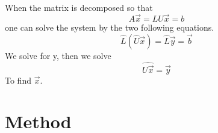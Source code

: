 \documentclass[%
reprint,
amsmath,amssymb,
aps,
]{revtex4-1}
\begin{document}
\noindent When the matrix is decomposed so that 
\begin{equation}
A\vec{x} = LU\vec{x} = b
\end{equation}
one can solve the system by the two following equations. 
\begin{equation} \label{eq8}
\hat{L} (\hat{U}\vec{x}) = \hat{L}\vec{y} = \vec{b}
\end{equation}
We solve for y, then we solve 
\begin{equation} \label{eq9}
\hat{U\vec{x}} = \vec{y}
\end{equation}
To find $\vec{x}$.






\section*{Method}
\end{document}
